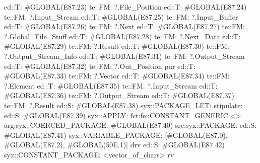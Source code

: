                                             ed::T: #GLOBAL(E87.23) te::FM: ?.File_Position
                                                ed::T: #GLOBAL(E87.24)
                                                 te::FM:
                                                 ?.Input_Stream
                                                ed::T: #GLOBAL(E87.25)
                                                 te::FM:
                                                 ?.Input_Buffer
                                                ed::T: #GLOBAL(E87.26)
                                                 te::FM:
                                                 ?.Next
                                                ed::T: #GLOBAL(E87.27)
                                                 te::FM:
                                                 ?.Global_File_Stuff
                                            ed::T: #GLOBAL(E87.28) te::FM: ?.Next_Data
                                            ed::T: #GLOBAL(E87.29) te::FM: ?.Result
                                            ed::T: #GLOBAL(E87.30) te::FM: ?.Output_Stream_Info
                                            ed::T: #GLOBAL(E87.31) te::FM: ?.Output_Stream
                                            ed::T: #GLOBAL(E87.32) te::FM: ?.Out_Position
                                     pur
                                ed::T: #GLOBAL(E87.33) te::FM: ?.Vector
                                ed::T: #GLOBAL(E87.34) te::FM: ?.Element
                                ed::T: #GLOBAL(E87.35) te::FM: ?.Input_Stream
                                ed::T: #GLOBAL(E87.36) te::FM: ?.Output_Stream
                                ed::T: #GLOBAL(E87.37) te::FM: ?.Result
                                    ed::S: #GLOBAL(E87.38)
                                        syx::PACKAGE_LET:
                                            stipulate:  ed::S: #GLOBAL(E87.39)
                                                            syx::APPLY:
                                                                fct:fe::CONSTANT_GENERIC:<>
                                                                arg:syx::COERCED_PACKAGE:
                                                                        #GLOBAL(E87.40)
                                                                         src:syx::PACKAGE:
                                                                                ed::S: #GLOBAL(E87.41) syx::VARIABLE_PACKAGE: [#GLOBAL(E87.0), #GLOBAL(E87.2), #GLOBAL(50E.1)] drv
                                                                                ed::S: #GLOBAL(E87.42) syx::CONSTANT_PACKAGE: <vector_of_chars> rv
